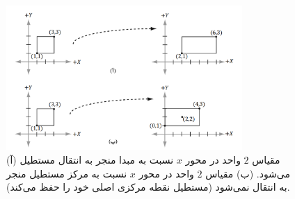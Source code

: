 {\begin{spacing}{1.5}
\begin{enumerate}[label=\textbf{\arabic*}.]
{                \begin{figure}[H]
                    \centering
                    \setlength{\belowcaptionskip}{-10pt}
                    \includegraphics[width=0.8\textwidth]{Images/4/3/4.Session.1.3.18}
                    \caption {(آ) مقیاس $2$ واحد در محور $x$ نسبت به مبدا منجر به انتقال مستطیل می‌شود.
                        (ب) مقیاس $2$ واحد در محور $x$ نسبت به مرکز مستطیل منجر به انتقال نمی‌شود (مستطیل نقطه مرکزی اصلی خود را حفظ می‌کند).}
                    \label{fig:4.Session.1.3.18}
                \end{figure}
            }
        \end{enumerate}
    \end{spacing}
}